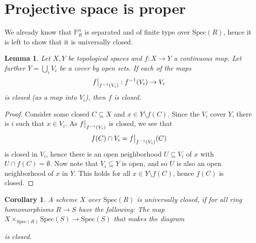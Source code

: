 \documentclass{scrartcl}
\renewcommand{\P}{\mathbb{P}}
\newcommand{\Spec}{\mathrm{Spec}}
\newcommand\restr[2]{{
    \left.\kern-\nulldelimiterspace
    #1
    \vphantom{\big|}
    \right|_{#2}
}}
\newtheorem{lemma}[prop]{Lemma}
\newtheorem{corollary}[prop]{Corollary}
\theoremstyle{definition}
\begin{document}
\section{Projective space is proper}
We already know that $\P_R^n$ is separated and of finite type over $\Spec(R)$, hence it is left to show that it is universally closed.
\begin{lemma}
    Let $X, Y$ be topological spaces and $f: X \to Y$ a continuous map.
    Let further $Y = \bigcup_i V_i$ be a cover by open sets.
    If each of the maps
    \begin{equation*}
        \restr{f}{f^{-1}(V_i)}: f^{-1}(V_i) \to V_i
    \end{equation*}
    is closed (as a map into $V_i$), then $f$ is closed.
\end{lemma}
\begin{proof}
    Consider some closed $C \subseteq X$ and $x \in Y \setminus f(C)$.
    Since the $V_i$ cover $Y$, there is $i$ such that $x \in V_i$.
    As $\restr{f}{f^{-1}(V_i)}$ is closed, we see that
    \begin{equation*}
        f(C) \cap V_i = \restr{f}{f^{-1}(V_i)}(C)
    \end{equation*}
    is closed in $V_i$, hence there is an open neighborhood $U \subseteq V_i$ of $x$ with $U \cap f(C) = \emptyset$.
    Now note that $V_i \subseteq Y$ is open, and so $U$ is also an open neighborhood of $x$ in $Y$.
    This holds for all $x \in Y \setminus f(C)$, hence $f(C)$ is closed.
\end{proof}
\begin{corollary}
    A scheme $X$ over $\Spec(R)$ is universally closed, if for all ring homomorphisms $R \to S$ have the following:
    The map $X \times_{\Spec(R)} \Spec(S) \to \Spec(S)$ that makes the diagram
    \begin{center}
    \end{center}
    is closed.
\end{corollary}
\end{document}

